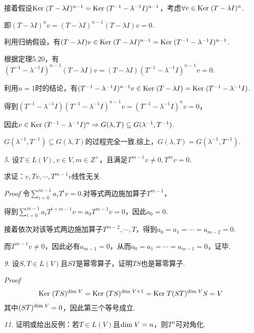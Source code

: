 接着假设\(\mathrm{Ker \;} (T-\lambda I)^{n-1}=\mathrm{Ker \;} (T^{-1}-\lambda^{-1} I)^{n-1}\)，考虑\(\forall v \in \mathrm{Ker \;} (T-\lambda I)^n\).

即\((T-\lambda I)^n v=(T-\lambda I)^{n-1}(T-\lambda I)v=0\).

利用归纳假设，有\((T-\lambda I)v \in \mathrm{Ker \;} (T-\lambda I)^{n-1}=\mathrm{Ker \;} (T^{-1}-\lambda^{-1} I)^{n-1}\).

根据定理5.20，有\((T^{-1}-\lambda^{-1} I)^{n-1}(T-\lambda I)v=(T-\lambda I)(T^{-1}-\lambda^{-1} I)^{n-1}v=0\).

利用\(n=1\)时的结论，有\((T^{-1}-\lambda^{-1} I)^{n-1}v \in \mathrm{Ker \;} (T-\lambda I)=\mathrm{Ker \;} (T^{-1}-\lambda^{-1} I)\).

得到\((T^{-1}-\lambda^{-1} I)(T^{-1}-\lambda^{-1} I)^{n-1}v=(T^{-1}-\lambda^{-1} I)^n v=0\)，

因此\(v \in \mathrm{Ker \;} (T^{-1}-\lambda^{-1} I)^n \Rightarrow G(\lambda,T) \subseteq G(\lambda^{-1},T^{-1})\).

\(G(\lambda^{-1},T^{-1}) \subseteq G(\lambda,T)\)的过程完全一致.综上，\(G(\lambda,T)=G(\lambda^{-1},T^{-1})\).

\hspace*{\fill}

\textit{5.}
设\(T \in L(V),v \in V,m \in Z^+\)，且满足\(T^{m-1}v \ne 0,T^m v=0\).

求证：\(v,Tv,\cdots,T^{m-1}v\)线性无关.

\textit{Proof}
令\(\sum_{i=0}^{m-1} a_iT^i v=0\).对等式两边施加算子\(T^{m-1}\)，

得到\(\sum_{i=0}^{m-1} a_iT^{i+m-1} v=a_0T^{m-1} v=0\)，因此\(a_0=0\).

接着依次对该等式两边施加算子\(T^{m-2},\cdots,T\)，得到\(a_0=a_1=\cdots=a_{m-2}=0\).

而\(T^{m-1}v \ne 0\)，因此必有\(a_{m-1}=0\)，从而\(a_0=a_1=\cdots=a_{m-1}=0\)，证毕.

\hspace*{\fill}

\textit{9.}
设\(S,T \in L(V)\)且\(ST\)是幂零算子，证明\(TS\)也是幂零算子.

\textit{Proof}
    \begin{align*}
        \mathrm{Ker \;} (TS)^{\mathrm{dim \;} V}=\mathrm{Ker \;} (TS)^{\mathrm{dim \;} V+1}=\mathrm{Ker \;} T(ST)^{\mathrm{dim \;} V}S=V
    \end{align*}
其中\((ST)^{\mathrm{dim \;} V}=0\)，因此第三个等号成立.

\hspace*{\fill}

\textit{11.}
证明或给出反例：若\(T \in L(V)\)且\(\mathrm{dim \;} V=n\)，则\(T^n\)可对角化.

